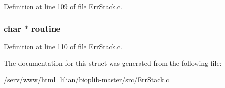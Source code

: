 Definition at line 109 of file Err\-Stack.\-c.

\hypertarget{struct__errorstack_a9c97800f18eafaf3ba425d24e6f3f1ad}{
\subsubsection[{routine}]{\setlength{\rightskip}{0pt plus 5cm}char $\ast$ routine}}\label{struct__errorstack_a9c97800f18eafaf3ba425d24e6f3f1ad}


Definition at line 110 of file Err\-Stack.\-c.



The documentation for this struct was generated from the following file\-:\begin{DoxyCompactItemize}
\item 
/serv/www/html\-\_\-lilian/bioplib-\/master/src/\hyperlink{_err_stack_8c}{Err\-Stack.\-c}\end{DoxyCompactItemize}
